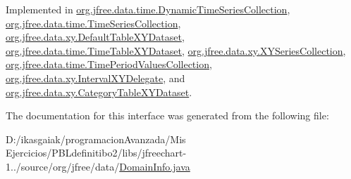 Implemented in \mbox{\hyperlink{classorg_1_1jfree_1_1data_1_1time_1_1_dynamic_time_series_collection_a471679946440bd1e4a7b9fd2f8c7b21a}{org.\+jfree.\+data.\+time.\+Dynamic\+Time\+Series\+Collection}}, \mbox{\hyperlink{classorg_1_1jfree_1_1data_1_1time_1_1_time_series_collection_ac3a9f4f6c020c7797a7788a412d34463}{org.\+jfree.\+data.\+time.\+Time\+Series\+Collection}}, \mbox{\hyperlink{classorg_1_1jfree_1_1data_1_1xy_1_1_default_table_x_y_dataset_ad6bbc5140fa56a7fc588d2a6597e208d}{org.\+jfree.\+data.\+xy.\+Default\+Table\+X\+Y\+Dataset}}, \mbox{\hyperlink{classorg_1_1jfree_1_1data_1_1time_1_1_time_table_x_y_dataset_ae597f42b0c5c2b5b9b7515e1af48c5ba}{org.\+jfree.\+data.\+time.\+Time\+Table\+X\+Y\+Dataset}}, \mbox{\hyperlink{classorg_1_1jfree_1_1data_1_1xy_1_1_x_y_series_collection_af943c8f3bbfd29d446a6af8018d9d8b1}{org.\+jfree.\+data.\+xy.\+X\+Y\+Series\+Collection}}, \mbox{\hyperlink{classorg_1_1jfree_1_1data_1_1time_1_1_time_period_values_collection_a254bd47cf2e1576a887592818fd5269e}{org.\+jfree.\+data.\+time.\+Time\+Period\+Values\+Collection}}, \mbox{\hyperlink{classorg_1_1jfree_1_1data_1_1xy_1_1_interval_x_y_delegate_a15d3687d86832c5cb4b8b346f716e8c2}{org.\+jfree.\+data.\+xy.\+Interval\+X\+Y\+Delegate}}, and \mbox{\hyperlink{classorg_1_1jfree_1_1data_1_1xy_1_1_category_table_x_y_dataset_a9b3fb26c625c5e1d04b30277f993edc1}{org.\+jfree.\+data.\+xy.\+Category\+Table\+X\+Y\+Dataset}}.



The documentation for this interface was generated from the following file\+:\begin{DoxyCompactItemize}
\item 
D\+:/ikasgaiak/programacion\+Avanzada/\+Mis Ejercicios/\+P\+B\+Ldefinitibo2/libs/jfreechart-\/1../source/org/jfree/data/\mbox{\hyperlink{_domain_info_8java}{Domain\+Info.\+java}}\end{DoxyCompactItemize}
